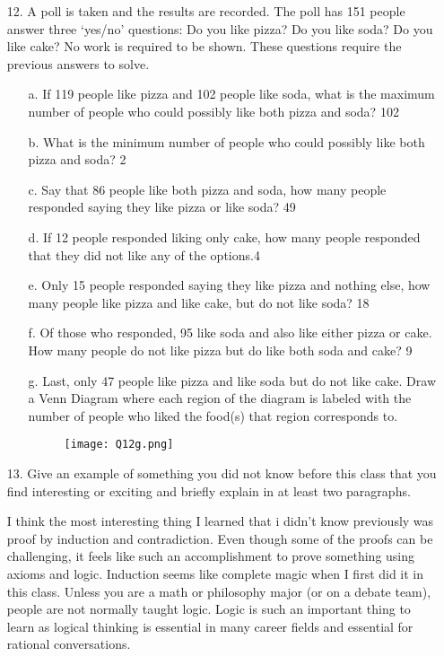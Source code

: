 \documentclass{article}
\begin{document}
\begin{itemize}
    \item[12.] A poll is taken and the results are recorded.  The poll has 151 people answer three ‘yes/no’ questions:  Do you like pizza? Do you like soda? Do you like cake?  No work is required to be shown.  These questions require the previous answers to solve.
    \begin{itemize}
        \item[a.] If 119 people like pizza and 102 people like soda, what is the maximum number of people who could possibly like both pizza and soda? {\color{blue}102}
        \item[b.] What is the minimum number of people who could possibly like both pizza and soda? {\color{blue}2}
        \item[c.] Say that 86 people like both pizza and soda, how many people responded saying they like pizza or like soda? {\color{blue}49}
        \item[d.] If 12 people responded liking only cake, how many people responded that they did not like any of the options.{\color{blue}4}
        \item[e.] Only 15 people responded saying they like pizza and nothing else, how many people like pizza and like cake, but do not like soda? {\color{blue}18}
        \item[f.] Of those who responded, 95 like soda and also like either pizza or cake.  How many people do not like pizza but do like both soda and cake? {\color{blue}9}
        \item[g.] Last, only 47 people like pizza and like soda but do not like cake.  Draw a Venn Diagram where each region of the diagram is labeled with the number of people who liked the food(s) that region corresponds to. {\color{blue}}
        \begin{figure}[h]
            \centering
            \texttt{[image: Q12g.png]}
        \end{figure}
        
    \end{itemize}
    
    \item[13.] Give an example of something you did not know before this class that you find interesting or exciting and briefly explain in at least two paragraphs.
    
    I think the most interesting thing I learned that i didn't know previously was proof by induction and contradiction.  Even though some of the proofs can be challenging, it feels like such an accomplishment to prove something using axioms and logic.  Induction seems like complete magic when I first did it in this class. Unless you are a math or philosophy major (or on a debate team), people are not normally taught logic.  Logic is such an important thing to learn as logical thinking is essential in many career fields and essential for rational conversations. 
    

\end{itemize}
\end{document}
